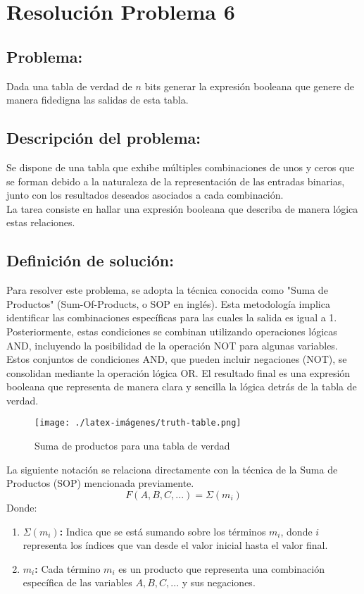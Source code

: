 \section{Resolución Problema 6}
\subsection{Problema:}
Dada una tabla de verdad de $n$ bits generar la expresión booleana que genere de manera fidedigna las salidas de esta tabla.

\subsection{\textbf{Descripción del problema:}}
Se dispone de una tabla que exhibe múltiples combinaciones de unos y ceros que se forman debido a la naturaleza de la representación de las entradas binarias, junto con los resultados deseados asociados a cada combinación. \\
La tarea consiste en hallar una expresión booleana que describa de manera lógica estas relaciones.


\subsection{\textbf{Definición de solución:}}
Para resolver este problema, se adopta la técnica conocida como "Suma de Productos" (Sum-Of-Products, o SOP en inglés). Esta metodología implica identificar las combinaciones específicas para las cuales la salida es igual a 1. Posteriormente, estas condiciones se combinan utilizando operaciones lógicas AND, incluyendo la posibilidad de la operación NOT para algunas variables. \\
Estos conjuntos de condiciones AND, que pueden incluir negaciones (NOT), se consolidan mediante la operación lógica OR. El resultado final es una expresión booleana que representa de manera clara y sencilla la lógica detrás de la tabla de verdad.\\ 

\begin{figure}[h!]
    \centering
    \texttt{[image: ./latex-imágenes/truth-table.png]}
    \caption{Suma de productos para una tabla de verdad}
    \label{fig:enter-label}
\end{figure}

La siguiente notación se relaciona directamente con la técnica de la Suma de Productos (SOP) mencionada previamente.\\
\[ F(A, B, C, ...) = \Sigma(m_i) \]
Donde:
\begin{enumerate}

  \item \textbf{\(\Sigma(m_i)\):} Indica que se está sumando sobre los términos \(m_i\), donde \(i\) representa los índices que van desde el valor inicial hasta el valor final.

  \item \textbf{\(m_i\):} Cada término \(m_i\) es un producto que representa una combinación específica de las variables \(A, B, C, ...\) y sus negaciones.
\end{enumerate}

